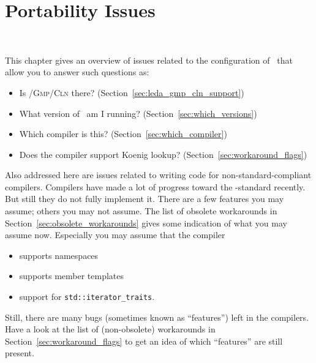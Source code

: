 
\chapter{Portability Issues}
\label{chap:portability}
 \\

This chapter gives an overview of issues related to the
configuration of \cgal\ that allow you to answer such questions as:
\begin{itemize}
\item Is \leda/\textsc{Gmp}/\textsc{Cln} there? (Section~\ref{sec:leda_gmp_cln_support})
\item What version of \cgal\ am I running? (Section~\ref{sec:which_versions})
\item Which compiler is this? (Section~\ref{sec:which_compiler})
\item Does the compiler support Koenig lookup? (Section~\ref{sec:workaround_flags})
\end{itemize}

Also addressed here are issues related to writing code for 
non-standard-compliant compilers.  Compilers have made a lot of progress toward 
the \CC-standard recently.  But still they do not fully implement it. There 
are a few features you may assume; others you may not assume. The list of 
obsolete workarounds in Section~\ref{sec:obsolete_workarounds} gives some 
indication of what you may assume now.  Especially you may assume that the 
compiler
\begin{itemize}
\item supports namespaces
\item supports member templates
\item support for \texttt{std::iterator\_traits}.
\end{itemize}
Still, there are many bugs (sometimes known as ``features'') left in the 
compilers.  Have a look at the list of (non-obsolete) workarounds in 
Section~\ref{sec:workaround_flags} to get an idea of which ``features'' are
still present.  

